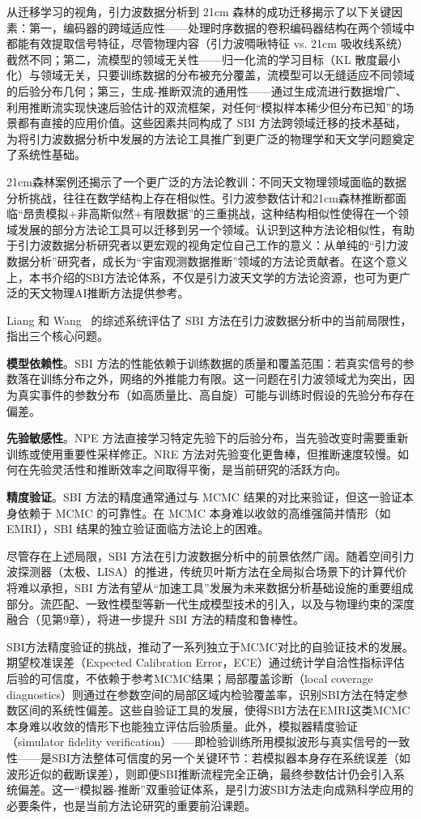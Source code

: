 从迁移学习的视角，引力波数据分析到 21cm 森林的成功迁移揭示了以下关键因素：第一，编码器的跨域适应性——处理时序数据的卷积编码器结构在两个领域中都能有效提取信号特征，尽管物理内容（引力波啁啾特征 vs. 21cm 吸收线系统）截然不同；第二，流模型的领域无关性——归一化流的学习目标（KL 散度最小化）与领域无关，只要训练数据的分布被充分覆盖，流模型可以无缝适应不同领域的后验分布几何；第三，生成-推断双流的通用性——通过生成流进行数据增广、利用推断流实现快速后验估计的双流框架，对任何“模拟样本稀少但分布已知”的场景都有直接的应用价值。这些因素共同构成了 SBI 方法跨领域迁移的技术基础，为将引力波数据分析中发展的方法论工具推广到更广泛的物理学和天文学问题奠定了系统性基础。

21cm森林案例还揭示了一个更广泛的方法论教训：不同天文物理领域面临的数据分析挑战，往往在数学结构上存在相似性。引力波参数估计和21cm森林推断都面临“昂贵模拟+非高斯似然+有限数据”的三重挑战，这种结构相似性使得在一个领域发展的部分方法论工具可以迁移到另一个领域。认识到这种方法论相似性，有助于引力波数据分析研究者以更宏观的视角定位自己工作的意义：从单纯的“引力波数据分析”研究者，成长为“宇宙观测数据推断”领域的方法论贡献者。在这个意义上，本书介绍的SBI方法论体系，不仅是引力波天文学的方法论资源，也可为更广泛的天文物理AI推断方法提供参考。

Liang 和 Wang~\cite{liang2026sbireview} 的综述系统评估了 SBI 方法在引力波数据分析中的当前局限性，指出三个核心问题。

\textbf{模型依赖性}。SBI 方法的性能依赖于训练数据的质量和覆盖范围：若真实信号的参数落在训练分布之外，网络的外推能力有限。这一问题在引力波领域尤为突出，因为真实事件的参数分布（如高质量比、高自旋）可能与训练时假设的先验分布存在偏差。

\textbf{先验敏感性}。NPE 方法直接学习特定先验下的后验分布，当先验改变时需要重新训练或使用重要性采样修正。NRE 方法对先验变化更鲁棒，但推断速度较慢。如何在先验灵活性和推断效率之间取得平衡，是当前研究的活跃方向。

\textbf{精度验证}。SBI 方法的精度通常通过与 MCMC 结果的对比来验证，但这一验证本身依赖于 MCMC 的可靠性。在 MCMC 本身难以收敛的高维强简并情形（如 EMRI），SBI 结果的独立验证面临方法论上的困难。

尽管存在上述局限，SBI 方法在引力波数据分析中的前景依然广阔。随着空间引力波探测器（太极、LISA）的推进，传统贝叶斯方法在全局拟合场景下的计算代价将难以承担，SBI 方法有望从``加速工具''发展为未来数据分析基础设施的重要组成部分。流匹配、一致性模型等新一代生成模型技术的引入，以及与物理约束的深度融合（见第9章），将进一步提升 SBI 方法的精度和鲁棒性。

SBI方法精度验证的挑战，推动了一系列独立于MCMC对比的自验证技术的发展。期望校准误差（Expected Calibration Error，ECE）通过统计学自洽性指标评估后验的可信度，不依赖于参考MCMC结果；局部覆盖诊断（local coverage diagnostics）则通过在参数空间的局部区域内检验覆盖率，识别SBI方法在特定参数区间的系统性偏差。这些自验证工具的发展，使得SBI方法在EMRI这类MCMC本身难以收敛的情形下也能独立评估后验质量。此外，模拟器精度验证（simulator fidelity verification）——即检验训练所用模拟波形与真实信号的一致性——是SBI方法整体可信度的另一个关键环节：若模拟器本身存在系统误差（如波形近似的截断误差），则即便SBI推断流程完全正确，最终参数估计仍会引入系统偏差。这一``模拟器-推断''双重验证体系，是引力波SBI方法走向成熟科学应用的必要条件，也是当前方法论研究的重要前沿课题。

